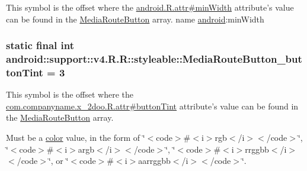 This symbol is the offset where the \hyperlink{}{android.R.attr\#minWidth} attribute's value can be found in the \hyperlink{classandroid_1_1support_1_1v4_1_1_r_1_1styleable_b8373fc29d9d3ae7c46174f3caf39215}{MediaRouteButton} array.  name \hyperlink{namespaceandroid}{android}:minWidth \hypertarget{classandroid_1_1support_1_1v4_1_1_r_1_1styleable_c0211c76c5d560a47ec498d31003f0b6}{
\subsubsection[{MediaRouteButton\_\-buttonTint}]{\setlength{\rightskip}{0pt plus 5cm}static final int android::support::v4.R.R::styleable::MediaRouteButton\_\-buttonTint = 3}}
\label{classandroid_1_1support_1_1v4_1_1_r_1_1styleable_c0211c76c5d560a47ec498d31003f0b6}


This symbol is the offset where the \hyperlink{classcom_1_1companyname_1_1x__2doo_1_1_r_1_1attr_098bf3b103dda75d67334479e76ee41f}{com.companyname.x\_\-2doo.R.attr\#buttonTint} attribute's value can be found in the \hyperlink{classandroid_1_1support_1_1v4_1_1_r_1_1styleable_b8373fc29d9d3ae7c46174f3caf39215}{MediaRouteButton} array.

Must be a \hyperlink{classandroid_1_1support_1_1v4_1_1_r_1_1color}{color} value, in the form of \char`\"{}$<$code$>$\#$<$i$>$rgb$<$/i$>$$<$/code$>$\char`\"{}, \char`\"{}$<$code$>$\#$<$i$>$argb$<$/i$>$$<$/code$>$\char`\"{}, \char`\"{}$<$code$>$\#$<$i$>$rrggbb$<$/i$>$$<$/code$>$\char`\"{}, or \char`\"{}$<$code$>$\#$<$i$>$aarrggbb$<$/i$>$$<$/code$>$\char`\"{}. 

